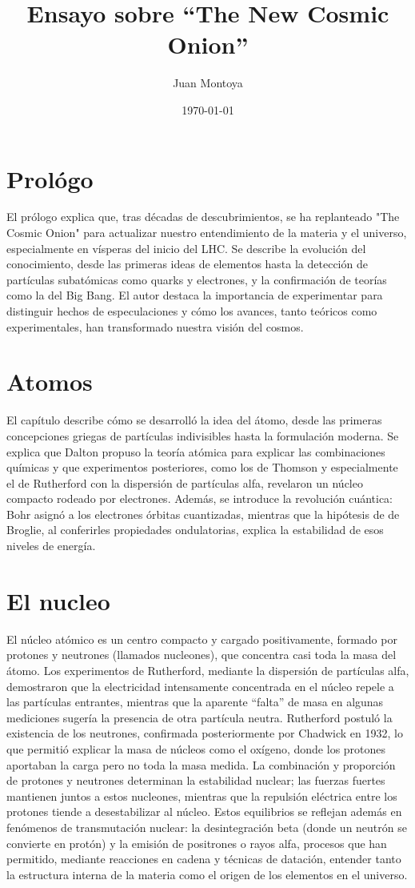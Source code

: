\documentclass[12pt]{article}
\title{Ensayo sobre “The New Cosmic Onion”}
\author{Juan Montoya}
\date{\today}
\begin{document}
\maketitle

\section{Prológo}
El prólogo explica que, tras décadas de descubrimientos, se ha replanteado "The Cosmic Onion" para actualizar nuestro entendimiento de la materia y el universo, especialmente en vísperas del inicio del LHC. Se describe la evolución del conocimiento, desde las primeras ideas de elementos hasta la detección de partículas subatómicas como quarks y electrones, y la confirmación de teorías como la del Big Bang. El autor destaca la importancia de experimentar para distinguir hechos de especulaciones y cómo los avances, tanto teóricos como experimentales, han transformado nuestra visión del cosmos.

\section{Atomos}
El capítulo describe cómo se desarrolló la idea del átomo, desde las primeras concepciones griegas de partículas indivisibles hasta la formulación moderna. Se explica que Dalton propuso la teoría atómica para explicar las combinaciones químicas y que experimentos posteriores, como los de Thomson y especialmente el de Rutherford con la dispersión de partículas alfa, revelaron un núcleo compacto rodeado por electrones. Además, se introduce la revolución cuántica: Bohr asignó a los electrones órbitas cuantizadas, mientras que la hipótesis de de Broglie, al conferirles propiedades ondulatorias, explica la estabilidad de esos niveles de energía.

\section{El nucleo}
El núcleo atómico es un centro compacto y cargado positivamente, formado por protones y neutrones (llamados nucleones), que concentra casi toda la masa del átomo. Los experimentos de Rutherford, mediante la dispersión de partículas alfa, demostraron que la electricidad intensamente concentrada en el núcleo repele a las partículas entrantes, mientras que la aparente “falta” de masa en algunas mediciones sugería la presencia de otra partícula neutra. Rutherford postuló la existencia de los neutrones, confirmada posteriormente por Chadwick en 1932, lo que permitió explicar la masa de núcleos como el oxígeno, donde los protones aportaban la carga pero no toda la masa medida. La combinación y proporción de protones y neutrones determinan la estabilidad nuclear; las fuerzas fuertes mantienen juntos a estos nucleones, mientras que la repulsión eléctrica entre los protones tiende a desestabilizar al núcleo. Estos equilibrios se reflejan además en fenómenos de transmutación nuclear: la desintegración beta (donde un neutrón se convierte en protón) y la emisión de positrones o rayos alfa, procesos que han permitido, mediante reacciones en cadena y técnicas de datación, entender tanto la estructura interna de la materia como el origen de los elementos en el universo.
\end{document}
